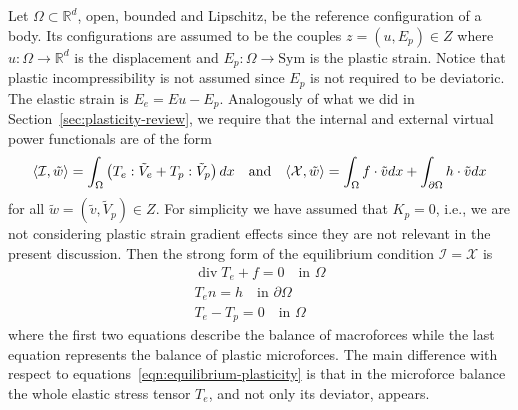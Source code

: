 \documentclass[a4paper,10pt,twoside]{amsbook}
\numberwithin{section}{chapter}
\numberwithin{equation}{chapter}
\theoremstyle{definition}
\DeclareMathOperator{\diver}{div}
\DeclarePairedDelimiter{\dual}{\langle}{\rangle}
\begin{document}
Let $\Omega\subset\mathbb{R}^d$, open, bounded and Lipschitz, be the reference configuration of a body. Its configurations are assumed to be the couples $z=(u,E_p)\in Z$ where $u\colon\Omega\to\mathbb{R}^d$ is the displacement and $E_p\colon\Omega\to\text{Sym}$ is the plastic strain. Notice that plastic incompressibility is not assumed since $E_p$ is not required to be deviatoric. The elastic strain is $E_e=Eu-E_p$. Analogously of what we did in Section~\ref{sec:plasticity-review}, we require that the internal and external virtual power functionals are of the form
\[
\dual{\mathcal{I},\tilde w}=\int_\Omega\left(T_e:\tilde V_e+T_p:\tilde V_p\right)dx
\quad\text{and}\quad
\dual{\mathcal{X},\tilde w}=\int_\Omega f\cdot\tilde vdx+\int_{\partial\Omega}h\cdot\tilde vdx
\]
for all $\tilde w=(\tilde v,\tilde V_p)\in Z$. For simplicity we have assumed that $K_p=0$, i.e., we are not considering plastic strain gradient effects since they are not relevant in the present discussion. Then the strong form of the equilibrium condition $\mathcal{I}=\mathcal{X}$ is
\begin{gather}
\diver T_e+f=0\quad\text{in $\Omega$} \\
T_en=h\quad\text{in $\partial\Omega$} \\
T_e-T_p=0\quad\text{in $\Omega$}
\end{gather}
where the first two equations describe the balance of macroforces while the last equation represents the balance of plastic microforces. The main difference with respect to equations~\eqref{eqn:equilibrium-plasticity} is that in the microforce balance the whole elastic stress tensor $T_e$, and not only its deviator, appears.
\end{document}
